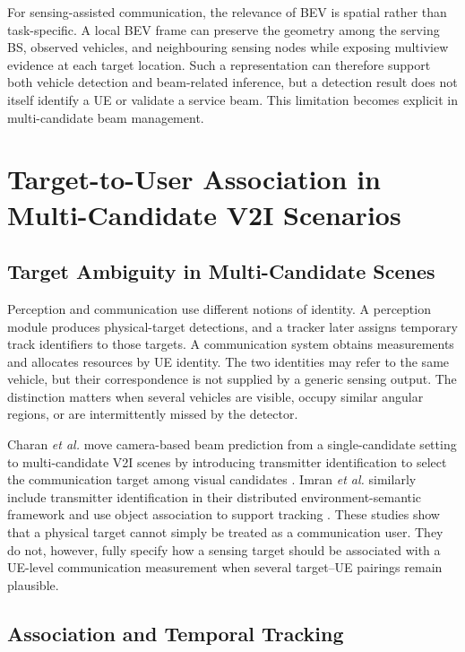 For sensing-assisted communication, the relevance of BEV is spatial rather than
task-specific.  A local BEV frame can preserve the geometry among the serving
BS, observed vehicles, and neighbouring sensing nodes while exposing multiview
evidence at each target location.  Such a representation can therefore support
both vehicle detection and beam-related inference, but a detection result does
not itself identify a UE or validate a service beam.  This limitation becomes
explicit in multi-candidate beam management.

\section{Target-to-User Association in Multi-Candidate V2I Scenarios}
\label{sec:background-target-user-association}

\subsection{Target Ambiguity in Multi-Candidate Scenes}
\label{subsec:background-target-ambiguity}

Perception and communication use different notions of identity.  A perception
module produces physical-target detections, and a tracker later assigns
temporary track identifiers to those targets.  A communication system obtains
measurements and allocates resources by UE identity.  The two identities may
refer to the same vehicle, but their correspondence is not supplied by a
generic sensing output.  The distinction matters when several vehicles are
visible, occupy similar angular regions, or are intermittently missed by the
detector.

Charan \emph{et al.} move camera-based beam prediction from a single-candidate
setting to multi-candidate V2I scenes by introducing transmitter identification
to select the communication target among visual candidates
\cite{charan2023camerabasedmmwavebeam}.  Imran \emph{et al.} similarly include
transmitter identification in their distributed environment-semantic framework
and use object association to support tracking
\cite{imran2024environmentsemanticcommunicationenabling}.  These studies show
that a physical target cannot simply be treated as a communication user.  They
do not, however, fully specify how a sensing target should be associated with a
UE-level communication measurement when several target--UE pairings remain
plausible.

\subsection{Association and Temporal Tracking}
\label{subsec:background-association-tracking}

